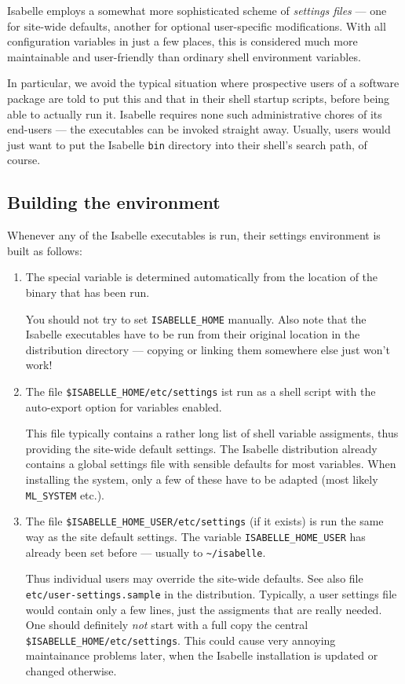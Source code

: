 Isabelle employs a somewhat more sophisticated scheme of
\emph{settings files} --- one for site-wide defaults, another for
optional user-specific modifications.  With all configuration
variables in just a few places, this is considered much more
maintainable and user-friendly than ordinary shell environment
variables.

In particular, we avoid the typical situation where prospective users
of a software package are told to put this and that in their shell
startup scripts, before being able to actually run it. Isabelle
requires none such administrative chores of its end-users --- the
executables can be invoked straight away. Usually, users would just
want to put the Isabelle \texttt{bin} directory into their shell's
search path, of course.


\subsection{Building the environment}

Whenever any of the Isabelle executables is run, their settings
environment is built as follows:

\begin{enumerate}
\item The special variable  is determined
  automatically from the location of the binary that has been run.
  
  You should not try to set \texttt{ISABELLE_HOME} manually. Also note
  that the Isabelle executables have to be run from their original
  location in the distribution directory --- copying or linking them
  somewhere else just won't work!
  
\item The file \texttt{\$ISABELLE_HOME/etc/settings} ist run as a
  shell script with the auto-export option for variables enabled.
  
  This file typically contains a rather long list of shell variable
  assigments, thus providing the site-wide default settings.  The
  Isabelle distribution already contains a global settings file with
  sensible defaults for most variables. When installing the system,
  only a few of these have to be adapted (most likely
  \texttt{ML_SYSTEM} etc.).
  
\item The file \texttt{\$ISABELLE_HOME_USER/etc/settings} (if it
  exists) is run the same way as the site default settings. The
  variable \texttt{ISABELLE_HOME_USER} has already been set before ---
  usually to \texttt{\~\relax/isabelle}.
  
  Thus individual users may override the site-wide defaults. See also
  file \texttt{etc/user-settings.sample} in the distribution.
  Typically, a user settings file would contain only a few lines, just
  the assigments that are really needed.  One should definitely
  \emph{not} start with a full copy the central
  \texttt{\$ISABELLE_HOME/etc/settings}. This could cause very
  annoying maintainance problems later, when the Isabelle installation
  is updated or changed otherwise.

\end{enumerate}

